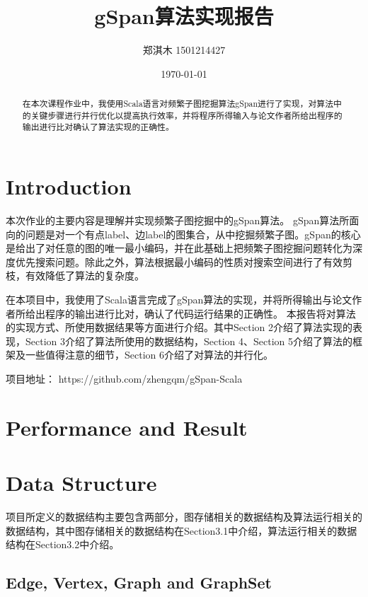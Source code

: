 \documentclass{article}
\title{gSpan算法实现报告}
\author{郑淇木  1501214427}
\date{\today}
\begin{document}
\maketitle

\begin{abstract}
在本次课程作业中，我使用Scala语言对频繁子图挖掘算法gSpan进行了实现，对算法中的关键步骤进行并行优化以提高执行效率，并将程序所得输入与论文作者所给出程序的输出进行比对确认了算法实现的正确性。

\end{abstract}

\section{Introduction}
本次作业的主要内容是理解并实现频繁子图挖掘中的gSpan算法\cite{gspan2002,gspanlong}。
gSpan算法所面向的问题是对一个有点label、边label的图集合，从中挖掘频繁子图。gSpan的核心是给出了对任意的图的唯一最小编码，并在此基础上把频繁子图挖掘问题转化为深度优先搜索问题。除此之外，算法根据最小编码的性质对搜索空间进行了有效剪枝，有效降低了算法的复杂度。

在本项目中，我使用了Scala语言完成了gSpan算法的实现，并将所得输出与论文作者所给出程序的输出进行比对，确认了代码运行结果的正确性。
本报告将对算法的实现方式、所使用数据结果等方面进行介绍。其中Section 2介绍了算法实现的表现，Section 3介绍了算法所使用的数据结构，Section 4、Section 5介绍了算法的框架及一些值得注意的细节，Section 6介绍了对算法的并行化。

项目地址： https://github.com/zhengqm/gSpan-Scala
\section{Performance and Result}



\section{Data Structure}

项目所定义的数据结构主要包含两部分，图存储相关的数据结构及算法运行相关的数据结构，其中图存储相关的数据结构在Section3.1中介绍，算法运行相关的数据结构在Section3.2中介绍。

\subsection{Edge, Vertex, Graph and GraphSet}
\end{document}
